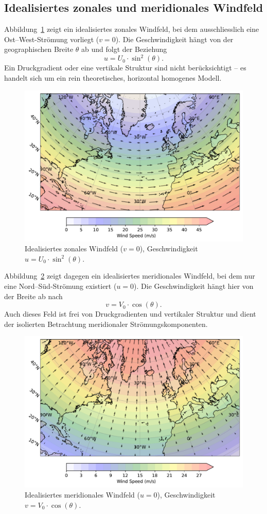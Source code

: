 
\subsection{Idealisiertes zonales und meridionales Windfeld}

Abbildung~\ref{fig:zonal_wind} zeigt ein idealisiertes zonales Windfeld, bei dem ausschliesslich eine Ost–West-Strömung vorliegt (\(v = 0\)).
Die Geschwindigkeit hängt von der geographischen Breite \(\theta\) ab und folgt der Beziehung
\begin{equation}
	u = U_0 \cdot \sin^2(\theta).
\label{eq:zonal_wind}
\end{equation}
Ein Druckgradient oder eine vertikale Struktur sind nicht berücksichtigt – es handelt sich um ein rein theoretisches, horizontal homogenes Modell.

\begin{figure}
	\centering
	\includegraphics[width=0.6\linewidth]{papers/rossby/images/zonal_wind_plot.pdf}
	\caption{Idealisiertes zonales Windfeld (\(v=0\)), Geschwindigkeit \(u = U_0 \cdot \sin^2(\theta)\).}
	\label{fig:zonal_wind}
\end{figure}

\noindent
Abbildung~\ref{fig:meridional_wind} zeigt dagegen ein idealisiertes meridionales Windfeld, bei dem nur eine Nord–Süd-Strömung existiert (\(u = 0\)).
Die Geschwindigkeit hängt hier von der Breite ab nach
\begin{equation}
	v = V_0 \cdot \cos(\theta).
\label{eq:meridional_wind}
\end{equation}
Auch dieses Feld ist frei von Druckgradienten und vertikaler Struktur und dient der isolierten Betrachtung meridionaler Strömungskomponenten.

\begin{figure}
	\centering
	\includegraphics[width=0.6\linewidth]{papers/rossby/images/meridional_wind_plot.pdf}
	\caption{Idealisiertes meridionales Windfeld (\(u=0\)), Geschwindigkeit \(v = V_0 \cdot \cos(\theta)\).}
	\label{fig:meridional_wind}
\end{figure}

